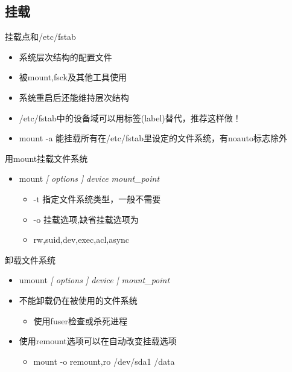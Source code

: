 \subsection{挂载}

\begin{frame}{挂载点和/etc/fstab}
\begin{itemize}
\item 系统层次结构的配置文件
\item 被mount,fsck及其他工具使用
\item 系统重启后还能维持层次结构
\item /etc/fstab中的设备域可以用标签(label)替代，推荐这样做！
\item mount -a 能挂载所有在/etc/fstab里设定的文件系统，有noauto标志除外
\end{itemize}

\end{frame} 
\begin{frame}{用mount挂载文件系统}
\begin{itemize}
\item mount \emph{{[} options {]}} \emph{device mount\_point}

\begin{itemize}
\item -t 指定文件系统类型，一般不需要
\item -o 挂载选项,缺省挂载选项为
\item rw,suid,dev,exec,acl,async
\end{itemize}
\end{itemize}

\end{frame} 
\begin{frame}{卸载文件系统}
\begin{itemize}
\item umount \emph{{[} options {]} device | mount\_point}
\item 不能卸载仍在被使用的文件系统

\begin{itemize}
\item 使用fuser检查或杀死进程
\end{itemize}
\item 使用remount选项可以在自动改变挂载选项

\begin{itemize}
\item mount -o remount,ro /dev/sda1 /data
\end{itemize}
\end{itemize}
\end{frame} 

